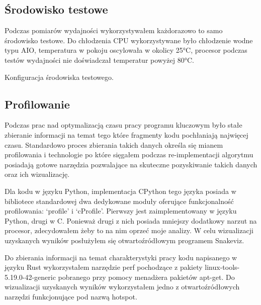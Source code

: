 \documentclass[11pt, a4paper]{article}
\begin{document}
\begin{sloppypar}
    \subsection{Środowisko testowe}
    Podczas pomiarów wydajności wykorzystywałem każdorazowo to samo środowisko testowe. Do
    chłodzenia CPU wykorzystywane było chłodzenie wodne typu AIO, temperatura w pokoju
    oscylowała w okolicy 25°C, procesor podczas testów wydajności nie doświadczał temperatur
    powyżej 80°C.

    \FloatBarrier
    \begin{table}[ht]
      \centering
      
      \caption{Konfiguracja środowiska testowego.}
      \label{pc-configuration}
    \end{table}
    \FloatBarrier

    \subsection{Profilowanie}
    Podczas prac nad optymalizacją czasu pracy programu kluczowym było stałe zbieranie
    informacji na temat tego które fragmenty kodu pochłaniają najwięcej czasu. Standardowo
    proces zbierania takich danych określa się mianem profilowania i technologie po które
    sięgałem podczas re-implementacji algorytmu posiadają gotowe narzędzia pozwalające na
    skuteczne pozyskiwanie takich danych oraz ich wizualizację.

    Dla kodu w języku Python, implementacja CPython tego języka posiada w bibliotece
    standardowej dwa dedykowane moduły oferujące funkcjonalność profilowania: `profile' i
    `cProfile'. Pierwszy jest zaimplementowany w języku Python, drugi w C. Ponieważ
    drugi z nich posiada mniejszy dodatkowy narzut na procesor, zdecydowałem żeby to na nim
    oprzeć moje analizy. W celu wizualizacji uzyskanych wyników posłużyłem się
    otwartoźródłowym programem Snakeviz\cite{Snakeviz_PyPI}.

    Do zbierania informacji na temat charakterystyki pracy kodu napisanego w języku Rust
    wykorzystałem narzędzie perf pochodzące z pakiety linux-tools-5.19.0-42-generic
    pobranego przy pomocy menadżera pakietów apt-get. Do wizualizacji uzyskanych wyników
    wykorzystałem jedno z otwartoźródłowych narzędzi funkcjonujące pod nazwą hotspot\cite{HOTSPOT}.


\end{sloppypar}
\end{document}
